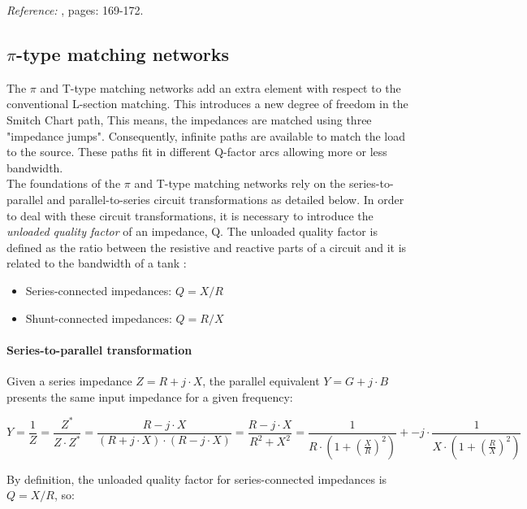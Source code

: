 \noindent \textit{Reference:} \cite{BahlFundamentalsRFMW}, pages: 169-172.

\subsection{$\pi$-type matching networks}
\noindent The $\pi$ and T-type matching networks add an extra element with respect to the conventional L-section matching. This introduces a new degree of freedom in the Smitch Chart path, This means, the impedances are matched using three "impedance jumps". Consequently, infinite paths are available to match the load to the source. These paths fit in different Q-factor arcs allowing more or less bandwidth. \\

\noindent The foundations of the $\pi$ and T-type matching networks rely on the series-to-parallel and parallel-to-series circuit transformations as detailed below. In order to deal with these circuit transformations, it is necessary to introduce the \textit{unloaded quality factor} of an impedance, Q.  The unloaded quality factor is defined as the ratio between the resistive and reactive parts of a circuit and it is related to the bandwidth of a tank \cite{TheDesignofCMOSRFIC}:

\begin{itemize}
 \item Series-connected impedances: $Q = X/R$
 \item Shunt-connected impedances: $Q = R/X$
\end{itemize}

\paragraph{Series-to-parallel transformation}
Given a series impedance $Z = R + j \cdot X$, the parallel equivalent $Y = G + j \cdot B$ presents the same input impedance for a given frequency:

\begin{equation}
Y = \frac{1}{Z} = \frac{Z^*}{Z \cdot Z^*} = \frac{R - j \cdot X}{(R + j \cdot X) \cdot (R - j \cdot X)} = \frac{R - j \cdot X}{R^2 + X^2} = \frac{1}{R \cdot \left( 1 + \left( \frac{X}{R} \right)^2\right)} +- j \cdot \frac{1}{X \cdot \left( 1 + \left( \frac{R}{X}\right)^2\right)}
\end{equation}

\noindent By definition, the unloaded quality factor for series-connected impedances is $Q = X/R$, so:


